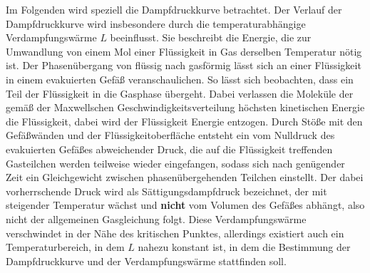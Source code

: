Im Folgenden wird speziell die Dampfdruckkurve betrachtet.
Der Verlauf der Dampfdruckkurve wird insbesondere durch die temperaturabhängige Verdampfungswärme $L$ beeinflusst.
Sie beschreibt die Energie, die zur Umwandlung von einem Mol einer Flüssigkeit in Gas derselben Temperatur nötig ist.
Der Phasenübergang von flüssig nach gasförmig lässt sich an einer Flüssigkeit in einem evakuierten Gefäß veranschaulichen.
So lässt sich beobachten, dass ein Teil der Flüssigkeit in die Gasphase übergeht.
Dabei verlassen die Moleküle der gemäß der Maxwellschen Geschwindigkeitsverteilung höchsten kinetischen Energie die Flüssigkeit, dabei wird der Flüssigkeit Energie entzogen.
Durch Stöße mit den Gefäßwänden und der Flüssigkeitoberfläche entsteht ein vom Nulldruck des evakuierten Gefäßes abweichender Druck, die auf die Flüssigkeit treffenden Gasteilchen werden teilweise wieder eingefangen, sodass sich nach genügender Zeit ein Gleichgewicht
zwischen phasenübergehenden Teilchen einstellt.
Der dabei vorherrschende Druck wird als Sättigungsdampfdruck bezeichnet, der mit steigender Temperatur wächst und \textbf{nicht} vom Volumen des Gefäßes abhängt, also nicht der allgemeinen Gasgleichung folgt. 
Diese Verdampfungswärme verschwindet in der Nähe des kritischen Punktes, allerdings existiert auch ein Temperaturbereich, in dem $L$ nahezu konstant ist, in dem die Bestimmung der Dampfdruckkurve und der Verdampfungswärme stattfinden soll.

